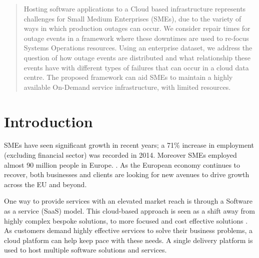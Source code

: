 \documentclass[conference]{IEEEtran}
\begin{document}
\begin{abstract}

Hosting software applications to a Cloud based infrastructure represents challenges for Small Medium Enterprises (SMEs), due to the variety of ways in which production outages can occur. We consider repair times for outage events in a framework where these downtimes are used to re-focus Systems Operations resources. Using an enterprise dataset, we address the question of how outage events are distributed and what relationship these events have with different types of failures that can occur in a cloud data centre. The proposed framework can aid SMEs to maintain a highly available On-Demand service infrastructure, with limited resources.
\end{abstract}


%
\IEEEpeerreviewmaketitle

\section{Introduction}

SMEs have seen significant growth in recent years; a 71\% increase in employment (excluding financial sector) was recorded in 2014. Moreover SMEs employed almost 90 million people in Europe. \cite{europa2015sme}. As the European economy continues to recover, both businesses and clients are looking for new avenues to drive growth across the EU and beyond. \par

One way to provide services with an elevated market reach is through a Software as a service (SaaS) model. This cloud-based approach is seen as a shift away from highly complex bespoke solutions, to more focused and cost effective solutions \cite{cloudbook2015}. As customers demand highly effective services to solve their business problems, a cloud platform can help keep pace with these needs. A single delivery platform is used to host multiple software solutions and services. \par
\end{document}
